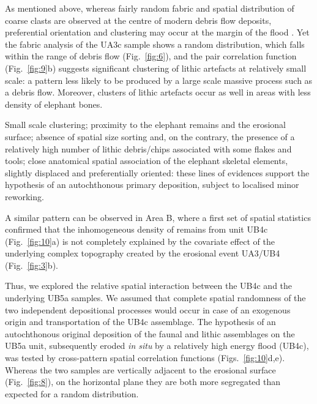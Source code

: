 \documentclass[review,authoryear,times]{elsarticle} %
\begin{document}
As mentioned above, whereas fairly random fabric and spatial distribution of coarse clasts are observed at the centre of modern debris flow deposits, preferential orientation and clustering may occur at the margin of the flood \citep{Pierson2005}. Yet the fabric analysis of the UA3c sample shows a random distribution, which falls within the range of debris flow (Fig.~\ref{fig:6}), and the pair correlation function (Fig.~\ref{fig:9}b) suggests significant clustering of lithic artefacts at relatively small scale: a pattern less likely to be produced by a large scale massive process such as a debris flow. Moreover, clusters of lithic artefacts occur as well in areas with less density of elephant bones.

Small scale clustering; proximity to the elephant remains and the erosional surface; absence of spatial size sorting and, on the contrary, the presence of a relatively high number of lithic debris/chips associated with some flakes and tools; close anatomical spatial association of the elephant skeletal elements, slightly displaced and preferentially oriented: these lines of evidences support the hypothesis of an autochthonous primary deposition, subject to localised minor reworking.


A similar pattern can be observed in Area B, where a first set of spatial statistics confirmed that the inhomogeneous density of remains from unit UB4c (Fig.~\ref{fig:10}a) is not completely explained by the covariate effect of the underlying complex topography created by the erosional event UA3/UB4 (Fig.~\ref{fig:3}b).

Thus, we explored the relative spatial interaction between the UB4c and the underlying UB5a samples. We assumed that complete spatial randomness of the two independent depositional processes would occur in case of an exogenous origin and transportation of the UB4c assemblage. The hypothesis of an autochthonous original deposition of the faunal and lithic assemblages on the UB5a unit, subsequently eroded \emph{in situ} by a relatively high energy flood (UB4c), was tested by cross-pattern spatial correlation functions (Figs.~\ref{fig:10}d,e). Whereas the two samples are vertically adjacent to the erosional surface (Fig.~\ref{fig:8}), on the horizontal plane they are both more segregated than expected for a random distribution.
\end{document}
